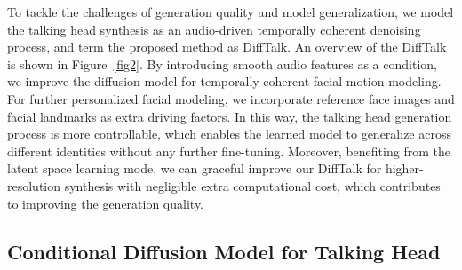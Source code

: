 \documentclass[10pt,twocolumn,letterpaper]{article}
\begin{document}
To tackle the challenges of generation quality and model generalization, we model the talking head synthesis as an audio-driven temporally coherent denoising process, and term the proposed method as DiffTalk. An overview of the DiffTalk is shown in Figure~\ref{fig2}. By introducing smooth audio features as a condition, we improve the diffusion model for temporally coherent facial motion modeling. For further personalized facial modeling, we incorporate reference face images and facial landmarks as extra driving factors. In this way, the talking head generation process is more controllable, which enables the learned model to generalize across different identities without any further fine-tuning. Moreover, benefiting from the latent space learning mode, we can graceful improve our DiffTalk for higher-resolution synthesis with negligible extra computational cost, which contributes to improving the generation quality.



\subsection{Conditional Diffusion Model for Talking Head}
\label{condition}
\end{document}
